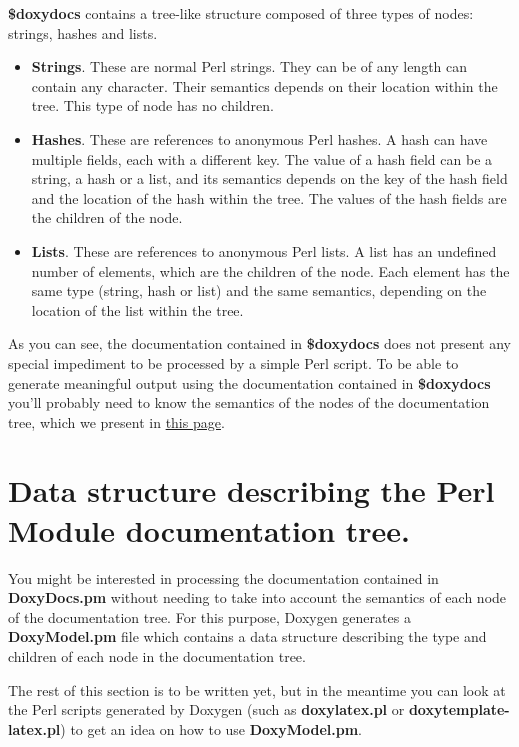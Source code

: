 {\bf \$doxydocs} contains a tree-like structure composed of three types of nodes: strings, hashes and lists.

\begin{itemize}
\item {\bf Strings}. These are normal Perl strings. They can be of any length can contain any character. Their semantics depends on their location within the tree. This type of node has no children.

\item {\bf Hashes}. These are references to anonymous Perl hashes. A hash can have multiple fields, each with a different key. The value of a hash field can be a string, a hash or a list, and its semantics depends on the key of the hash field and the location of the hash within the tree. The values of the hash fields are the children of the node.

\item {\bf Lists}. These are references to anonymous Perl lists. A list has an undefined number of elements, which are the children of the node. Each element has the same type (string, hash or list) and the same semantics, depending on the location of the list within the tree.

\end{itemize}


As you can see, the documentation contained in {\bf \$doxydocs} does not present any special impediment to be processed by a simple Perl script. To be able to generate meaningful output using the documentation contained in {\bf \$doxydocs} you'll probably need to know the semantics of the nodes of the documentation tree, which we present in \hyperlink{perlmod_tree}{this page}.\hypertarget{perlmod_doxymodel_format}{}\section{Data structure describing the Perl Module documentation tree.}\label{perlmod_doxymodel_format}
You might be interested in processing the documentation contained in {\bf DoxyDocs.pm} without needing to take into account the semantics of each node of the documentation tree. For this purpose, Doxygen generates a {\bf DoxyModel.pm} file which contains a data structure describing the type and children of each node in the documentation tree.

The rest of this section is to be written yet, but in the meantime you can look at the Perl scripts generated by Doxygen (such as {\bf doxylatex.pl} or {\bf doxytemplate-latex.pl}) to get an idea on how to use {\bf DoxyModel.pm}. 